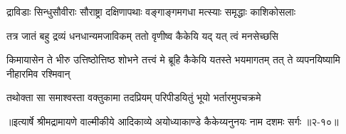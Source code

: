 \twolineshloka
{द्राविडाः सिन्धुसौवीराः सौराष्ट्रा दक्षिणापथाः}
{वङ्गाङ्गमगधा मत्स्याः समृद्धाः काशिकोसलाः} %

\twolineshloka
{तत्र जातं बहु द्रव्यं धनधान्यमजाविकम्}
{ततो वृणीष्व कैकेयि यद् यत् त्वं मनसेच्छसि} %

\threelineshloka
{किमायासेन ते भीरु उत्तिष्ठोत्तिष्ठ शोभने}
{तत्त्वं मे ब्रूहि कैकेयि यतस्ते भयमागतम्}
{तत् ते व्यपनयिष्यामि नीहारमिव रश्मिवान्} %

\twolineshloka
{तथोक्ता सा समाश्वस्ता वक्तुकामा तदप्रियम्}
{परिपीडयितुं भूयो भर्तारमुपचक्रमे} %


॥इत्यार्षे श्रीमद्रामायणे वाल्मीकीये आदिकाव्ये अयोध्याकाण्डे कैकेय्यनुनयः नाम दशमः सर्गः ॥२-१०॥
